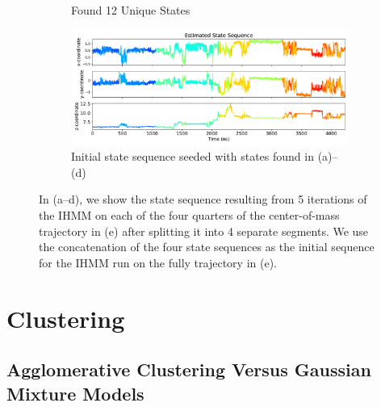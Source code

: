 \documentclass{article}
\begin{document}
\begin{figure}
\begin{subfigure}{0.48\textwidth}
  \caption{Found 12 Unique States}\label{fig:segment4}
  \end{subfigure}
  \begin{subfigure}{1\textwidth}
  \includegraphics[width=\textwidth]{seed_ACH21_full.pdf}
  \caption{Initial state sequence seeded with states found in (a)--(d)}\label{fig:full}
  \end{subfigure}
  \caption{In (a--d), we show the state sequence resulting from 5 iterations
  of the IHMM on each of the four quarters of the center-of-mass trajectory in
  (e) after splitting it into 4 separate segments. We use the concatenation 
  of the four state sequences as the initial sequence for the IHMM run on the 
  fully trajectory in (e).
  }\label{fig:seed_sequence}
  \end{figure}
  
  \section{Clustering}\label{section:clustering}
  
  \subsection{Agglomerative Clustering Versus Gaussian Mixture Models}\label{section:agglomerative}
  
  
\end{document}
